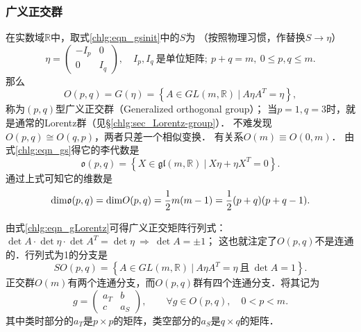 \subsubsection{广义正交群}\label{chlg:sec_Opq}
在实数域$\mathbb{R}$中，取式\eqref{chlg:eqn_gsinit}中的$S$为
（按照物理习惯，作替换$S\to \eta$）
\begin{equation}\label{chlg:eqn_generalized-Lorentz-metric}
    \eta = \begin{pmatrix}
        -I_p & 0 \\  0 & I_q
    \end{pmatrix},
    \quad I_p,I_q \  \text{是单位矩阵};\
    p+q=m,\ 0\leqslant p,q\leqslant m .
\end{equation}
那么
\begin{equation}\label{chlg:eqn_gLorentz}
    O(p,q)=G(\eta)= \left\{ A \in GL(m,\mathbb{R})\ |\ A \eta {A}^T =\eta \right\},
\end{equation}
称为$(p,q)$型{\heiti 广义正交群}（Generalized orthogonal group）；
当$p=1,q=3$时，就是通常的Lorentz群（见\S\ref{chlg:sec_Lorentz-group}）．
不难发现$O(p,q)\cong O(q,p)$，两者只差一个相似变换．
有关系$O(m)\equiv O(0,m)$．
由式\eqref{chlg:eqn_gs}得它的李代数是
\begin{equation}\label{chlg:eqn_LA-opq}
    \mathfrak{o}(p,q)= \left\{ X \in 
    \mathfrak{gl}(m,\mathbb{R})\ |\  X\eta + \eta {X}^T =0 \right\}.
\end{equation}
通过上式可知它的维数是
\begin{equation}
    {\rm dim} \mathfrak{o}(p,q) = {\rm dim} O(p,q) = 
    \frac{1}{2}m(m-1)=\frac{1}{2}(p+q)(p+q-1).
\end{equation}

由式\eqref{chlg:eqn_gLorentz}可得广义正交矩阵行列式：
$ \det A \cdot\det\eta\cdot \det A^T = \det \eta \ \Rightarrow \ \det A = \pm 1$；
这也就注定了$O(p,q)$不是连通的．行列式为1的分支是
\begin{equation}\label{chlg:eqn_LG-sopq}
    SO(p,q)= \left\{ A \in GL(m,\mathbb{R})\ |\ A \eta {A}^T =\eta 
    \ \text{且}\ \det A = 1 \right\} .
\end{equation}
正交群$O(m)$有两个连通分支，而$O(p,q)$群有四个连通分支．将其记为
\begin{equation}
    g=\begin{pmatrix}
        a_T & b \\ c & a_S
    \end{pmatrix},
    \qquad \forall g\in O(p,q) ,\quad 0 < p < m.
\end{equation}
其中类时部分的$a_T$是$p\times p$的矩阵，类空部分的$a_S$是$q\times q$的矩阵．


